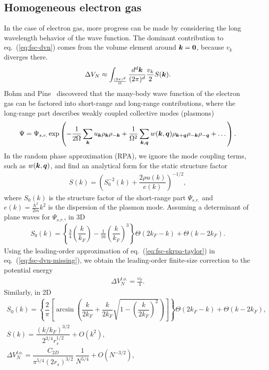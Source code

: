 \subsection{Homogeneous electron gas}
In the case of electron gas, more progress can be made by considering the long wavelength behavior of the wave function. The dominant contribution to eq.~(\ref{eq:fsc-dvn}) comes from the volume element around $\boldsymbol{k}=\boldsymbol{0}$, because $v_k$ diverges there.
\begin{align} \label{eq:fsc-dvn-missing}
\Delta V_N \approx \int_{\frac{(2\pi)^d}{\Omega}} \dfrac{d^d\boldsymbol{k}}{(2\pi)^d} \frac{v_k}{2}S(\boldsymbol{k}).
\end{align}
Bohm and Pine~\cite{Bohm1953} discovered that the many-body wave function of the electron gas can be factored into short-range and long-range contributions, where the long-range part describes weakly coupled collective modes (plasmons)~\cite{Chiesa2007,Holzmann2016}
\begin{align} \label{eq:fsc-rpa-wf}
\Psi = \Psi_{s.r.} \exp\left(
-\frac{1}{2\Omega} \sum\limits_{\boldsymbol{k}} u_{\boldsymbol{k}} \rho_{\boldsymbol{k}} \rho_{-\boldsymbol{k}} + \frac{1}{\Omega^2}\sum\limits_{\boldsymbol{k},\boldsymbol{q}} w(\boldsymbol{k}, \boldsymbol{q}) \rho_{\boldsymbol{k}+\boldsymbol{q}}\rho_{-\boldsymbol{k}}\rho_{-\boldsymbol{q}}+\dots
\right).
\end{align}
In the random phase approximation (RPA), we ignore the mode coupling terms, such as $w(\boldsymbol{k},\boldsymbol{q})$, and find an analytical form for the static structure factor~\cite{Gaskell1961}
\begin{align} \label{eq:gaskell-rpa-sk}
S(k) = \left(
S_0^{-2}(k) + \dfrac{2\rho u(k)}{e(k)}
\right)^{-1/2},
\end{align}
where $S_0(k)$ is the structure factor of the short-range part $\Psi_{s.r.}$ and $e(k)=\frac{\hbar^2}{2m}k^2$ is the dispersion of the plasmon mode.
Assuming a determinant of plane waves for $\Psi_{s.r.}$, in 3D~\cite{Gori-Giorgi2000}
\begin{align}
S_0(k) = \left\{
\frac{3}{4}\left( \dfrac{k}{k_F} \right) - \frac{1}{16}\left(\dfrac{k}{k_F}\right)^3\right\} \Theta(2k_F-k) + \Theta(k-2k_F).
\end{align}
Using the leading-order approximation of eq.~(\ref{eq:fsc-skrpa-taylor}) in eq.~(\ref{eq:fsc-dvn-missing}), we obtain the leading-order finite-size correction to the potential energy
\begin{align}
\Delta V_N^{l.o.} = \frac{\omega_p}{4}.
\end{align}
Similarly, in 2D~\cite{Gori-Giorgi2004}
\begin{align}
S_0(k) = \left\{
\dfrac{2}{\pi}\left[
\arcsin\left(\dfrac{k}{2k_F}+\dfrac{k}{2k_F}\sqrt{1-\left(\dfrac{k}{2k_F}\right)^2}\right)
\right]\right\} \Theta(2k_F-k) + \Theta(k-2k_F), \\
S(k) = \dfrac{(k/k_F)^{3/2}}{2^{3/4}r_s^{1/2}} + O(k^2), \label{eq:fsc-skrpa2d}\\
\Delta V_N^{l.o.} = \dfrac{C_{2D}}{\pi^{5/4} (2r_s)^{3/2}}~\dfrac{1}{N^{5/4}} + O(N^{-3/2}), \label{eq:fsc-dv2d-lo}
\end{align}
